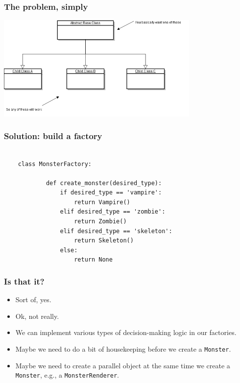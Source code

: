 \documentclass[10pt]{beamer}
\begin{document}
\begin{frame}
	\frametitle{The problem, simply}

	\includegraphics[width=100mm]{basic_uml.png}
\end{frame}

\begin{frame}[fragile]
	\frametitle{Solution: build a factory}

	\begin{verbatim}

	class MonsterFactory:
            
            def create_monster(desired_type):
                if desired_type == 'vampire':
                    return Vampire()
                elif desired_type == 'zombie':
                    return Zombie()
                elif desired_type == 'skeleton':
                    return Skeleton()
                else:
                    return None
        \end{verbatim}
\end{frame}

\begin{frame}
	\frametitle{Is that it?}

	\begin{itemize}
		\item Sort of, yes.
		\item Ok, not really.
		\item We can implement various types of
			decision-making logic in our factories.
		\item Maybe we need to do a bit of housekeeping
			before we create a \texttt{Monster}.
		\item Maybe we need to create a parallel object
			at the same time we create a \texttt{Monster},
			e.g., a \texttt{MonsterRenderer}.
	\end{itemize}
\end{frame}
\end{document}
